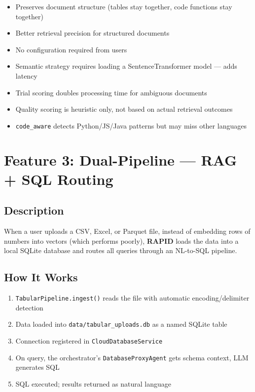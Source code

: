 \documentclass[12pt, a4paper, oneside]{report}
\newcommand{\kw}[1]{\texttt{\small #1}}
\newcommand{\rapidsys}{\textbf{\color{rapidblue}RAPID}}
\begin{document}
\begin{probox}[Benefits]
\begin{itemize}
  \item Preserves document structure (tables stay together, code functions stay together)
  \item Better retrieval precision for structured documents
  \item No configuration required from users
\end{itemize}
\end{probox}

\begin{conbox}[Drawbacks]
\begin{itemize}
  \item Semantic strategy requires loading a SentenceTransformer model — adds latency
  \item Trial scoring doubles processing time for ambiguous documents
  \item Quality scoring is heuristic only, not based on actual retrieval outcomes
  \item \kw{code\_aware} detects Python/JS/Java patterns but may miss other languages
\end{itemize}
\end{conbox}

\section{Feature 3: Dual-Pipeline — RAG + SQL Routing}

\subsection*{Description}
When a user uploads a CSV, Excel, or Parquet file, instead of embedding rows of numbers into
vectors (which performs poorly), \rapidsys{} loads the data into a local SQLite database and
routes all queries through an NL-to-SQL pipeline.

\subsection*{How It Works}
\begin{enumerate}
  \item \kw{TabularPipeline.ingest()} reads the file with automatic encoding/delimiter detection
  \item Data loaded into \kw{data/tabular\_uploads.db} as a named SQLite table
  \item Connection registered in \kw{CloudDatabaseService}
  \item On query, the orchestrator's \kw{DatabaseProxyAgent} gets schema context, LLM generates SQL
  \item SQL executed; results returned as natural language
\end{enumerate}
\end{document}
